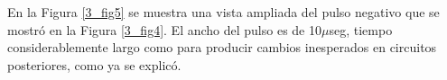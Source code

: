 En la Figura \ref{3_fig5} se muestra una vista ampliada del pulso negativo que se mostró en la Figura \ref{3_fig4}. El ancho del pulso es de 10$\mu$seg, tiempo considerablemente largo como para producir cambios inesperados en circuitos posteriores, como ya se explicó.




